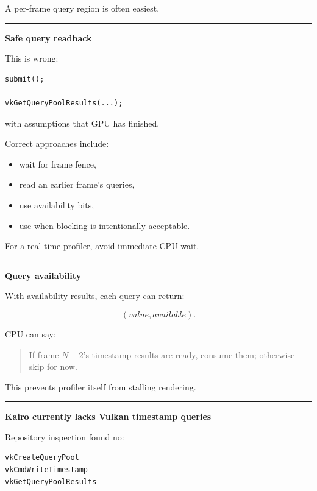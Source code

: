 A per-frame query region is often easiest.

\begin{center}\rule{0.5\linewidth}{0.5pt}\end{center}

\textbf{Safe query readback}

This is wrong:

\begin{verbatim}
submit();

vkGetQueryPoolResults(...);
\end{verbatim}

with assumptions that GPU has finished.

Correct approaches include:

\begin{itemize}
\tightlist
\item
  wait for frame fence,
\item
  read an earlier frame's queries,
\item
  use availability bits,
\item
  use  when blocking is intentionally acceptable.
\end{itemize}

For a real-time profiler, avoid immediate CPU wait.

\begin{center}\rule{0.5\linewidth}{0.5pt}\end{center}

\textbf{Query availability}

With availability results, each query can return:

\[
(value,available).
\]

CPU can say:

\begin{quote}
If frame \(N-2\)'s timestamp results are ready, consume them; otherwise skip for now.
\end{quote}

This prevents profiler itself from stalling rendering.

\begin{center}\rule{0.5\linewidth}{0.5pt}\end{center}

\textbf{Kairo currently lacks Vulkan timestamp queries}

Repository inspection found no:

\begin{verbatim}
vkCreateQueryPool
vkCmdWriteTimestamp
vkGetQueryPoolResults
\end{verbatim}

